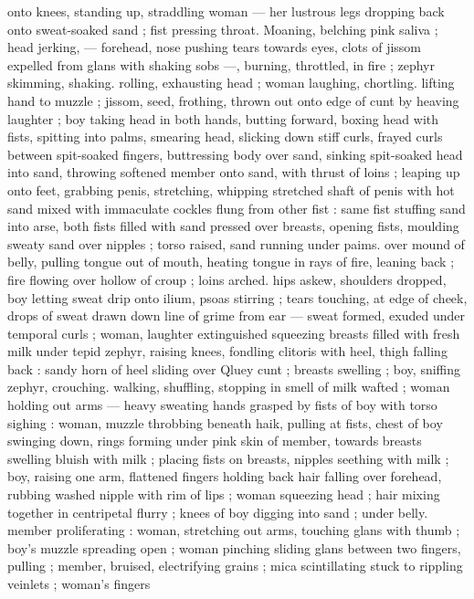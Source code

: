onto knees, standing up, straddling woman --- her lustrous legs 
dropping back onto sweat-soaked sand ; fist pressing throat. 
Moaning, belching pink saliva ; head jerking, --- forehead, nose 
pushing tears towards eyes, clots of jissom expelled from glans with 
shaking sobs ---, burning, throttled, in fire ; zephyr skimming, 
shaking. rolling, exhausting head ; woman laughing, chortling. lifting 
hand to muzzle ; jissom, seed, frothing, thrown out onto edge of cunt 
by heaving laughter ; boy taking head in both hands, butting forward, 
boxing head with fists, spitting into palms, smearing head, slicking 
down stiff curls, frayed curls between spit-soaked fingers, 
buttressing body over sand, sinking spit-soaked head into sand, 
throwing softened member onto sand, with thrust of loins ; leaping 
up onto feet, grabbing penis, stretching, whipping stretched shaft of 
penis with hot sand mixed with immaculate cockles flung from other 
fist : same fist stuffing sand into arse, both fists filled with sand 
pressed over breasts, opening fists, moulding sweaty sand over 
nipples ; torso raised, sand running under paims. over mound of 
belly, pulling tongue out of mouth, heating tongue in rays of fire, 
leaning back ; fire flowing over hollow of croup ; loins arched. hips 
askew, shoulders dropped, boy letting sweat drip onto ilium, psoas 
stirring ; tears touching, at edge of cheek, drops of sweat drawn 
down line of grime from ear --- sweat formed, exuded under 
temporal curls ; woman, laughter extinguished squeezing breasts 
filled with fresh milk under tepid zephyr, raising knees, fondling 
clitoris with heel, thigh falling back : sandy horn of heel sliding over 
Qluey cunt ; breasts swelling ; boy, sniffing zephyr, crouching. 
walking, shuffling, stopping in smell of milk wafted ; woman holding 
out arms --- heavy sweating hands grasped by fists of boy with torso 
sighing : woman, muzzle throbbing beneath haik, pulling at fists, 
chest of boy swinging down, rings forming under pink skin of 
member, towards breasts swelling bluish with milk ; placing fists on 
breasts, nipples seething with milk ; boy, raising one arm, flattened 
fingers holding back hair falling over forehead, rubbing washed 
nipple with rim of lips ; woman squeezing head ; hair mixing together 
in centripetal flurry ; knees of boy digging into sand ; under belly. 
member proliferating : woman, stretching out arms, touching glans 
with thumb ; boy's muzzle spreading open ; woman pinching sliding 
glans between two fingers, pulling ; member, bruised, electrifying 
grains ; mica scintillating stuck to rippling veinlets ; woman's fingers 

